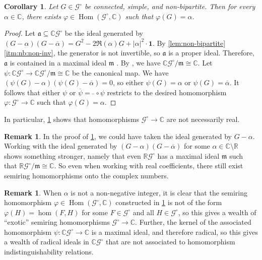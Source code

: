 \documentclass[11pt]{scrartcl}
\theoremstyle{definition}
\newtheorem{remark}[definition]{Remark}
\theoremstyle{plain}
\newtheorem{corollary}[definition]{Corollary}
\theoremstyle{remark}
\renewcommand\phi\varphi
\DeclareMathOperator\Hom{Hom}
\newcommand{\lG}{\mathcal{G}^\circ}
\newcommand{\C}{\mathbb{C}}
\newcommand{\R}{\mathbb{R}}
\begin{document}
	\begin{corollary}
		\label{cor:non-bipartite-quotient}
		Let $G \in \lG$ be connected, simple, and non-bipartite.
		Then for every $\alpha \in \C$, there exists $\phi \in \Hom(\lG , \C)$ such that $\phi(G) = \alpha$.
	\end{corollary}
	\begin{proof}


		Let $\mathfrak{a} \subseteq \C\lG$ be the ideal generated by $(G - \alpha)(G - \overline{\alpha}) = G^2 - 2\Re(\alpha)G + |\alpha|^2 \cdot \boldsymbol{1}$.
		By \cref{lem:non-bipartite}\ref{itm:nb:non-inv}, the generator is not invertible, so $\mathfrak{a}$ is a proper ideal.
		Therefore, $\mathfrak{a}$ is contained in a maximal ideal $\mathfrak m$ \cite[\href{https://stacks.math.columbia.edu/tag/00E0}{Tag 00E0}]{STACKS}.
		By \cite[\href{https://stacks.math.columbia.edu/tag/00FU}{Tag 00FU}]{STACKS}, we have $\C\lG / \mathfrak m \cong \C$.
		Let $\psi \colon \C\lG \to \C\lG / \mathfrak m \cong \C$ be the canonical map.
		We have $(\psi(G) - \alpha)(\psi(G) - \overline{\alpha}) = 0$, so either $\psi(G) = \alpha$ or $\psi(G) = \overline{\alpha}$.
		It follows that either $\psi$ or $\overline{\psi} = \bar{\, }\, \circ \psi$ restricts to the desired homomorphism $\phi \colon \lG \to \C$ such that $\phi(G) = \alpha$.
	\end{proof}
	
	In particular, \cref{cor:non-bipartite-quotient} shows that homomorphisms $\lG \to \C$ are not necessarily real.
	\begin{remark}
		In the proof of \cref{cor:non-bipartite-quotient}, we could have taken the ideal generated by $G - \alpha$.
		Working with the ideal generated by $(G - \alpha)(G - \overline{\alpha})$ for some $\alpha \in \C \setminus \R$ shows something stronger, namely that even $\R\lG$ has a maximal ideal $\mathfrak m$ such that $\R\lG / \mathfrak m \cong \C$.
		So even when working with real coefficients, there still exist semiring homomorphisms onto the complex numbers.
	\end{remark}

    \begin{remark}
    When $\alpha$ is not a non-negative integer, it is clear that the semiring homomorphism $\phi \in \Hom(\lG , \C)$ constructed in \cref{cor:non-bipartite-quotient} is not of the form $\phi(H) = \hom(F, H)$ for some $F \in \lG$ and all $H \in \lG$, so this gives a wealth of \enquote{exotic} semiring homomorphisms $\lG \to \C$.
    Further, the kernel of the associated homomorphism $\psi \colon \C\lG \to \C$ is a maximal ideal, and therefore radical, so this gives a wealth of radical ideals in $\C\lG$ that are not associated to homomorphism indistinguishability relations.
\end{remark}
\end{document}
